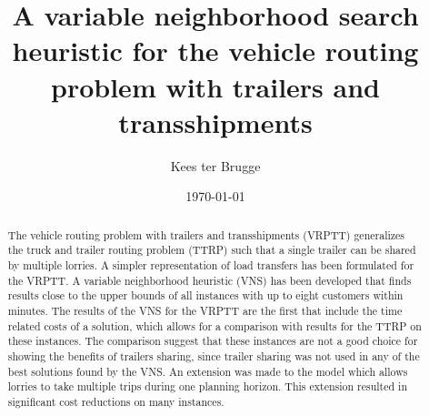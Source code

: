 \documentclass[a4paper]{article}
\title{A variable neighborhood search heuristic for the vehicle routing problem with trailers and transshipments}
\author{Kees ter Brugge}
\date{\today}
\begin{document}
\setlength{\parindent}{0pt}
\maketitle


\begin{abstract}
The vehicle routing problem with trailers and transshipments (VRPTT) generalizes the truck and trailer routing problem (TTRP) such that a single trailer can be shared by multiple lorries.
A simpler representation of load transfers has been formulated for the VRPTT.
A variable neighborhood heuristic (VNS) has been developed that finds results close to the upper bounds of all instances with up to eight customers within minutes.
The results of the VNS for the VRPTT are the first that include the time related costs of a solution, which allows for a comparison with results for the TTRP on these instances.
The comparison suggest that these instances are not a good choice for showing the benefits of trailers sharing, since trailer sharing was not used in any of the best solutions found by the VNS.
An extension was made to the model which allows lorries to take multiple trips during one planning horizon.
This extension resulted in significant cost reductions on many instances.



\end{abstract}

\newpage
\tableofcontents

\newpage


\newpage


\newpage


\newpage


\newpage


\newpage


\newpage


\newpage


\end{document}
